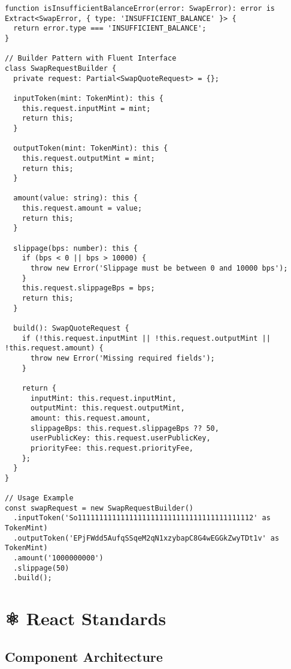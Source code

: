 \documentclass[11pt,a4paper]{article}
\begin{document}
\begin{lstlisting}[style=typescript, caption=Advanced TypeScript Patterns]
function isInsufficientBalanceError(error: SwapError): error is Extract<SwapError, { type: 'INSUFFICIENT_BALANCE' }> {
  return error.type === 'INSUFFICIENT_BALANCE';
}

// Builder Pattern with Fluent Interface
class SwapRequestBuilder {
  private request: Partial<SwapQuoteRequest> = {};

  inputToken(mint: TokenMint): this {
    this.request.inputMint = mint;
    return this;
  }

  outputToken(mint: TokenMint): this {
    this.request.outputMint = mint;
    return this;
  }

  amount(value: string): this {
    this.request.amount = value;
    return this;
  }

  slippage(bps: number): this {
    if (bps < 0 || bps > 10000) {
      throw new Error('Slippage must be between 0 and 10000 bps');
    }
    this.request.slippageBps = bps;
    return this;
  }

  build(): SwapQuoteRequest {
    if (!this.request.inputMint || !this.request.outputMint || !this.request.amount) {
      throw new Error('Missing required fields');
    }
    
    return {
      inputMint: this.request.inputMint,
      outputMint: this.request.outputMint,
      amount: this.request.amount,
      slippageBps: this.request.slippageBps ?? 50,
      userPublicKey: this.request.userPublicKey,
      priorityFee: this.request.priorityFee,
    };
  }
}

// Usage Example
const swapRequest = new SwapRequestBuilder()
  .inputToken('So11111111111111111111111111111111111111112' as TokenMint)
  .outputToken('EPjFWdd5AufqSSqeM2qN1xzybapC8G4wEGGkZwyTDt1v' as TokenMint)
  .amount('1000000000')
  .slippage(50)
  .build();
\end{lstlisting}

\section{⚛️ React Standards}

\subsection{Component Architecture}
\end{document}
